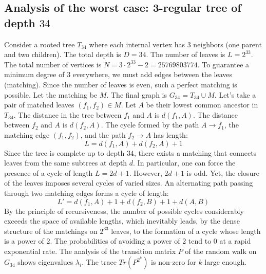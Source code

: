 \documentclass[12pt,a4paper]{article}
\begin{document}
\subsection{Analysis of the worst case: 3-regular tree of depth $34$}
Consider a rooted tree $T_{34}$ where each internal vertex has 3 neighbors (one parent and two children).
The total depth is $D = 34$.
The number of leaves is $L = 2^{33}$.
The total number of vertices is $N = 3 \cdot 2^{33} - 2 = 25769803774$.
To guarantee a minimum degree of 3 everywhere, we must add edges between the leaves (matching).
Since the number of leaves is even, such a perfect matching is possible.
Let the matching be $M$. The final graph is $G_{34} = T_{34} \cup M$.
Let's take a pair of matched leaves $(f_1, f_2) \in M$.
Let $A$ be their lowest common ancestor in $T_{34}$.
The distance in the tree between $f_1$ and $A$ is $d(f_1, A)$.
The distance between $f_2$ and $A$ is $d(f_2, A)$.
The cycle formed by the path $A \to f_1$, the matching edge $(f_1, f_2)$, and the path $f_2 \to A$ has length:
$$ L = d(f_1, A) + d(f_2, A) + 1 $$
Since the tree is complete up to depth $34$, there exists a matching that connects leaves from the same subtrees at depth $d$.
In particular, one can force the presence of a cycle of length $L = 2d + 1$. However, $2d+1$ is odd.
Yet, the closure of the leaves imposes several cycles of varied sizes. An alternating path passing through two matching edges forms a cycle of length:
$$ L' = d(f_1, A) + 1 + d(f_2, B) + 1 + d(A, B) $$
By the principle of recursiveness, the number of possible cycles considerably exceeds the space of available lengths, which inevitably leads, by the dense structure of the matchings on $2^{33}$ leaves, to the formation of a cycle whose length is a power of 2. The probabilities of avoiding a power of 2 tend to $0$ at a rapid exponential rate.
The analysis of the transition matrix $P$ of the random walk on $G_{34}$ shows eigenvalues $\lambda_i$. The trace $Tr(P^{2^k})$ is non-zero for $k$ large enough.
\end{document}
